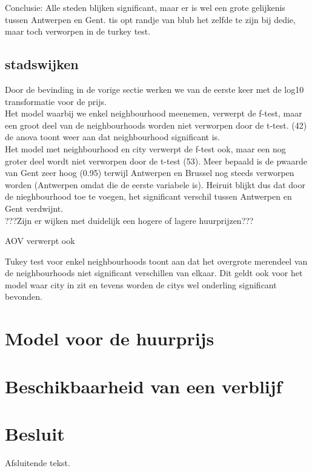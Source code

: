 \documentclass[a4paper,kulak]{kulakarticle} %
\begin{document}
Conclusie: Alle steden blijken significant, maar er is wel een grote gelijkenis tussen Antwerpen en Gent. tis opt randje van blub het zelfde te zijn bij dedie, maar toch verworpen in de turkey test.\\

\subsection{stadswijken}
Door de bevinding in de vorige sectie werken we van de eerste keer met de log10 transformatie voor de prijs. \\

Het model waarbij we enkel neighbourhood meenemen, verwerpt de f-test, maar een groot deel van de neighbourhoods worden niet verworpen door de t-test. (42) \\

de anova toont weer aan dat neighbourhood significant is.\\

Het model met neighbourhood en city verwerpt de f-test ook, maar een nog groter deel wordt niet verworpen door de t-test (53). Meer bepaald is de pwaarde van Gent zeer hoog (0.95) terwijl Antwerpen en Brussel nog steeds verworpen worden (Antwerpen omdat die de eerste variabele is). Heiruit blijkt dus dat door de nieghbourhood toe te voegen, het significant verschil tussen Antwerpen en Gent verdwijnt. \\

???Zijn er wijken met duidelijk een hogere of lagere huurprijzen???

AOV verwerpt ook 

Tukey test voor enkel neighbourhoods toont aan dat het overgrote merendeel van de neighbourhoods niet significant verschillen van elkaar. Dit geldt ook voor het model waar city in zit en tevens worden de citys wel onderling significant bevonden. 






\section{Model voor de huurprijs}

\section{Beschikbaarheid van een verblijf}


\section*{Besluit}

Afsluitende tekst.
\end{document}
